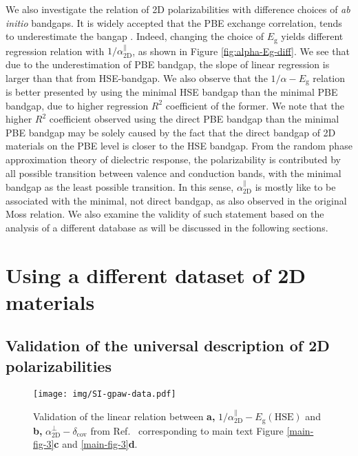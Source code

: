 \documentclass[journal=ancac3,email=true,hyperref=true,keywords=false]{achemso}
\begin{document}
We also investigate the relation of 2D polarizabilities with
difference choices of \textit{ab initio} bandgaps. It is widely
accepted that the PBE exchange correlation, tends to underestimate the
bangap \cite{Heyd_2005,Kumar_2016_PRB,Kumar_2016_jpcc}.  Indeed,
changing the choice of $E_{\mathrm{g}}$ yields different regression
relation with $1/\alpha_{\mathrm{2D}}^{\parallel}$, as shown in Figure
\ref{fig:alpha-Eg-diff}. We see that due to the underestimation of PBE
bandgap, the slope of linear regression is larger than that from
HSE-bandgap. We also observe that the $1/\alpha-E_{\mathrm{g}}$
relation is better presented by using the minimal HSE bandgap than the
minimal PBE bandgap, due to higher regression $R^{2}$ coefficient of
the former. We note that the higher $R^{2}$ coefficient observed using
the direct PBE bandgap than the minimal PBE bandgap may be solely
caused by the fact that the direct bandgap of 2D materials on the PBE
level is closer to the HSE bandgap. From the random phase
approximation theory of dielectric response, the polarizability is
contributed by all possible transition between valence and conduction
bands, with the minimal bandgap as the least possible transition. In
this sense, $\alpha_{\mathrm{2D}}^{\parallel}$ is mostly like to be associated with
the minimal, not direct bandgap, as also observed in the original Moss
relation. We also examine the validity of such statement based on the
analysis of a different database\cite{Haastrup_2018} 
as will be discussed in the following sections.


\section{Using a different dataset of 2D materials}
\label{sec:gpaw}
\subsection{Validation of the universal description of 2D polarizabilities}
\label{sec:gpaw-1}

\begin{figure}[htbp]
  \centering
  \texttt{[image: img/SI-gpaw-data.pdf]}
  \caption{Validation of the linear relation between \textbf{a,}
    $1/\alpha_{\mathrm{2D}}^{\parallel}-E_{\mathrm{g}}(\mathrm{HSE})$
    and \textbf{b,}
    $\alpha_{\mathrm{2D}}^{\perp}-\delta_{\mathrm{cov}}$ from 
    Ref.~ corresponding to main text Figure \ref{main-fig-3}{\bf c}
    and \ref{main-fig-3}{\bf d}.}
  \label{fig:gpaw-alpha-relation}
\end{figure}
\end{document}
